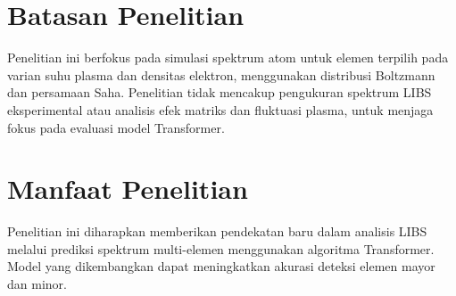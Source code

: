 \section{Batasan Penelitian}
Penelitian ini berfokus pada simulasi spektrum atom untuk elemen terpilih pada varian suhu plasma dan densitas elektron, menggunakan distribusi Boltzmann dan persamaan Saha. Penelitian tidak mencakup pengukuran spektrum LIBS eksperimental atau analisis efek matriks dan fluktuasi plasma, untuk menjaga fokus pada evaluasi model Transformer.

\section{Manfaat Penelitian}
Penelitian ini diharapkan memberikan pendekatan baru dalam analisis LIBS melalui prediksi spektrum multi-elemen menggunakan algoritma Transformer. Model yang dikembangkan dapat meningkatkan akurasi deteksi elemen mayor dan minor.
